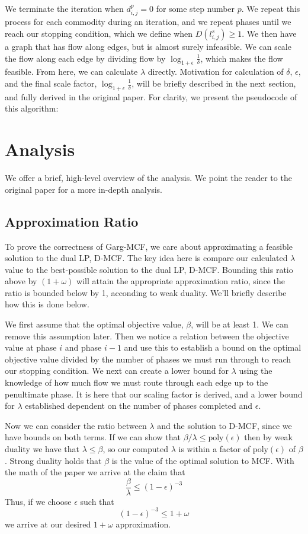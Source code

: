 We terminate
the iteration when $d_{i,j}^p=0$ for some step number $p$. We repeat
this process for each commodity during an iteration, and we repeat
phases until we reach our stopping condition, which we define when 
$D(l_{i,j}^s)\geq 1$. We then have a graph that has flow along edges, but
is almost surely infeasible. We can scale the flow along each edge by
dividing flow by $\log_{1+\epsilon}\frac{1}{\delta}$, which makes the
flow feasible. From here, we can calculate $\lambda$
directly. Motivation for calculation of $\delta$, $\epsilon$, and the
final scale factor, $\log_{1+\epsilon}\frac{1}{\delta}$, will be
briefly described in the next section, and fully derived in the
original paper. 
For clarity, we present the pseudocode of this
algorithm:


\section{Analysis}
We offer a brief, high-level overview of the analysis. We point the
reader to the original paper for a more in-depth analysis.
\subsection{Approximation Ratio}
To prove the correctness of Garg-MCF, we care about approximating a
feasible solution to the dual LP, D-MCF. The key idea here is compare
our calculated $\lambda$ value to the best-possible solution to the
dual LP, D-MCF. Bounding this ratio above by $(1+\omega)$ will attain
the appropriate approximation ratio, since the ratio is bounded below
by 1, acconding to weak duality. We'll briefly describe how this is
done below.

We first assume that the
optimal objective value, $\beta$, will be at least 1. We can remove this
assumption later. Then we notice a relation between the objective
value at phase $i$ and phase $i-1$ and use this to establish a bound
on the optimal objective value divided by the number of phases we must
run through to reach our stopping condition. We next can create a
lower bound for $\lambda$ using the knowledge of how much flow we must
route through each edge up to the penultimate phase. It is here that
our scaling factor is derived, and a lower bound for $\lambda$
established dependent on the number of phases completed and
$\epsilon$. 

Now we can consider the ratio between $\lambda$ and the solution to
D-MCF, since we have bounds on both terms. If we can show that
$\beta/\lambda\leq \text{poly}(\epsilon)$ then by weak duality we have
that $\lambda \leq \beta$, so our computed $\lambda$ is within a
factor of $\text{poly}(\epsilon)$ of $\beta$. Strong duality holds
that $\beta$ is the value of the optimal solution to MCF. With the
math of the paper  we arrive at the claim that 
$$\frac{\beta}{\lambda}\leq (1-\epsilon)^{-3}$$
Thus, if we choose $\epsilon$ such that 
$$(1-\epsilon)^{-3}\leq 1+\omega$$ 
we arrive at our desired $1+\omega$ approximation.
